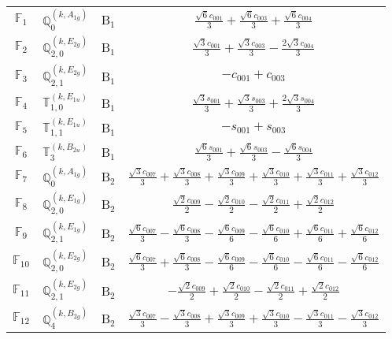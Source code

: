 \documentclass[fleqn,10pt,landscape]{article}
\begin{document}
\begin{itemize}
\begin{center}
\begin{longtable}{c|c|c|c}
$ \mathbb{F}_{1} $ & $\mathbb{Q}_{0}^{(k,A_{1g})}$ & B$_{1}$ & $\frac{\sqrt{6} c_{001}}{3} + \frac{\sqrt{6} c_{003}}{3} + \frac{\sqrt{6} c_{004}}{3}$ \\
$ \mathbb{F}_{2} $ & $\mathbb{Q}_{2,0}^{(k,E_{2g})}$ & B$_{1}$ & $\frac{\sqrt{3} c_{001}}{3} + \frac{\sqrt{3} c_{003}}{3} - \frac{2 \sqrt{3} c_{004}}{3}$ \\
$ \mathbb{F}_{3} $ & $\mathbb{Q}_{2,1}^{(k,E_{2g})}$ & B$_{1}$ & $- c_{001} + c_{003}$ \\
$ \mathbb{F}_{4} $ & $\mathbb{T}_{1,0}^{(k,E_{1u})}$ & B$_{1}$ & $\frac{\sqrt{3} s_{001}}{3} + \frac{\sqrt{3} s_{003}}{3} + \frac{2 \sqrt{3} s_{004}}{3}$ \\
$ \mathbb{F}_{5} $ & $\mathbb{T}_{1,1}^{(k,E_{1u})}$ & B$_{1}$ & $- s_{001} + s_{003}$ \\
$ \mathbb{F}_{6} $ & $\mathbb{T}_{3}^{(k,B_{2u})}$ & B$_{1}$ & $\frac{\sqrt{6} s_{001}}{3} + \frac{\sqrt{6} s_{003}}{3} - \frac{\sqrt{6} s_{004}}{3}$ \\ \hline
$ \mathbb{F}_{7} $ & $\mathbb{Q}_{0}^{(k,A_{1g})}$ & B$_{2}$ & $\frac{\sqrt{3} c_{007}}{3} + \frac{\sqrt{3} c_{008}}{3} + \frac{\sqrt{3} c_{009}}{3} + \frac{\sqrt{3} c_{010}}{3} + \frac{\sqrt{3} c_{011}}{3} + \frac{\sqrt{3} c_{012}}{3}$ \\
$ \mathbb{F}_{8} $ & $\mathbb{Q}_{2,0}^{(k,E_{1g})}$ & B$_{2}$ & $\frac{\sqrt{2} c_{009}}{2} - \frac{\sqrt{2} c_{010}}{2} - \frac{\sqrt{2} c_{011}}{2} + \frac{\sqrt{2} c_{012}}{2}$ \\
$ \mathbb{F}_{9} $ & $\mathbb{Q}_{2,1}^{(k,E_{1g})}$ & B$_{2}$ & $\frac{\sqrt{6} c_{007}}{3} - \frac{\sqrt{6} c_{008}}{3} - \frac{\sqrt{6} c_{009}}{6} - \frac{\sqrt{6} c_{010}}{6} + \frac{\sqrt{6} c_{011}}{6} + \frac{\sqrt{6} c_{012}}{6}$ \\
$ \mathbb{F}_{10} $ & $\mathbb{Q}_{2,0}^{(k,E_{2g})}$ & B$_{2}$ & $\frac{\sqrt{6} c_{007}}{3} + \frac{\sqrt{6} c_{008}}{3} - \frac{\sqrt{6} c_{009}}{6} - \frac{\sqrt{6} c_{010}}{6} - \frac{\sqrt{6} c_{011}}{6} - \frac{\sqrt{6} c_{012}}{6}$ \\
$ \mathbb{F}_{11} $ & $\mathbb{Q}_{2,1}^{(k,E_{2g})}$ & B$_{2}$ & $- \frac{\sqrt{2} c_{009}}{2} + \frac{\sqrt{2} c_{010}}{2} - \frac{\sqrt{2} c_{011}}{2} + \frac{\sqrt{2} c_{012}}{2}$ \\
$ \mathbb{F}_{12} $ & $\mathbb{Q}_{4}^{(k,B_{2g})}$ & B$_{2}$ & $\frac{\sqrt{3} c_{007}}{3} - \frac{\sqrt{3} c_{008}}{3} + \frac{\sqrt{3} c_{009}}{3} + \frac{\sqrt{3} c_{010}}{3} - \frac{\sqrt{3} c_{011}}{3} - \frac{\sqrt{3} c_{012}}{3}$ \\

\end{longtable}
\end{center}
\end{itemize}
\end{document}
